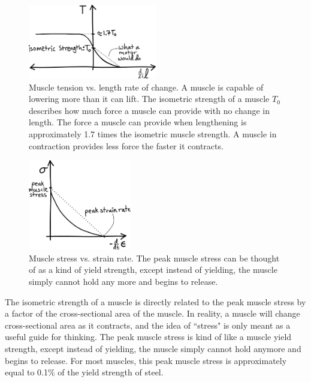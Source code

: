 \begin{figure}[htb]		%
\begin{centering}
\includegraphics[width=0.5\textwidth]{Figures/LiftingVsLowering}\par
\end{centering}
\caption[Plot: Muscle Tension vs. Length Rate of Change]{Muscle tension vs. length rate of change. A muscle is capable of lowering more than it can lift. The isometric strength of a muscle $T_{0}$ describes how much force a muscle can provide with no change in length. The force a muscle can provide when lengthening is approximately 1.7 times the isometric muscle strength. A muscle in contraction provides less force the faster it contracts.}
\label{fig:LiftingVsLowering}
\end{figure}
%

\begin{figure}[htb]		%
\begin{centering}
\includegraphics[width=0.4\textwidth]{Figures/PeakMuscleStress}\par
\end{centering}
\caption[Plot: Muscle Stress vs. Strain Rate]{Muscle stress vs. strain rate. The peak muscle stress can be thought of as a kind of yield strength, except instead of yielding, the muscle simply cannot hold any more and begins to release. }
\label{fig:PeakMuscleStress}
\end{figure}
%

The isometric strength of a muscle is directly related to the peak muscle stress by a factor of the cross-sectional area of the muscle. In reality, a muscle will change cross-sectional area as it contracts, and the idea of ``stress" is only meant as a useful guide for thinking. The peak muscle stress is kind of like a muscle yield strength, except instead of yielding, the muscle simply cannot hold anymore and begins to release. For most muscles, this peak muscle stress is approximately equal to 0.1\% of the yield strength of steel. 

